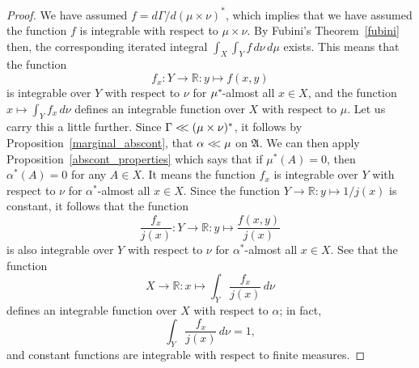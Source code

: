 \documentclass[
twoside=true,
paper=letter,
fontsize=9pt,
pagesize=auto,
leqno,
openany,
headsepline,
overfullrule,
]{scrbook}
\theoremstyle{plain}
\theoremstyle{plain}
\theoremstyle{definition}
\theoremstyle{bfnoteitalic}
\theoremstyle{bfnoteroman}
\newcommand{\sigalg}[1]{\mathfrak{#1}}
\newcommand{\R}{\mathbb{R}}
\newcommand{\sigmaalgebra}{\sigalg{A}}
\newcommand{\kernast}{\ast\kern-1pt}
\newcommand{\funcf}{f}
\newcommand{\funcj}{j}
\newcommand{\function}{f}
\newcommand{\measurespace}{X}
\newcommand{\measurespaceii}{Y}
\newcommand{\mspaceelt}{x}
\newcommand{\mspaceeltii}{y}
\newcommand{\abscont}{\mathrel{< \kern-3.5pt <}}
\newcommand{\measure}{\mu}
\newcommand{\measureii}{\nu}
\newcommand{\seti}{A}
\newcommand{\measonprod}{\Gamma}%
\newcommand{\marginalone}{\alpha}%
\begin{document}
\begin{proof}
We have assumed
$\function = d\measonprod / d(\measure\times\measureii)^*$,
which implies that we have assumed the function $\function$ is integrable with respect to 
$\measure\times\measureii$.
By Fubini's Theorem~\ref{fubini} then, the corresponding iterated integral
$\int_\measurespace\int_\measurespaceii \funcf \,d\measureii\,d\measure$
exists.
This means that the function
\[
\function_\mspaceelt:\measurespaceii\to\R :
\mspaceeltii\mapsto\function(\mspaceelt,\mspaceeltii)
\]
is integrable over $\measurespaceii$ with respect to $\measureii$ for 
$\measure^\kernast$-almost all 
$\mspaceelt\in\measurespace$,
and the function 
$\mspaceelt\mapsto 
\int_\measurespaceii \function_\mspaceelt \, d\measureii$ 
defines an integrable function over $\measurespace$ with respect to $\measure$.
Let us carry this
a little further.  
Since $\measonprod \abscont (\measure\times\measureii)^*$, it follows by Proposition~\ref{marginal_abscont}, that 
$\marginalone\abscont\measure$ on $\sigmaalgebra$.
We can then apply Proposition~\ref{abscont_properties} which says that if
$\measure^*(\seti)=0$, then $\marginalone^*(\seti)=0$ for any $\seti\in\measurespace$.
It means the function 
$\function_\mspaceelt$ 
is integrable over $\measurespaceii$ with respect to $\measureii$ for 
$\marginalone^*$-almost all $\mspaceelt\in\measurespace$.
Since the function
$\measurespaceii\to\R:\mspaceeltii\mapsto 1/ \funcj(\mspaceelt)$ 
is  constant, it follows that the function
\[
\frac{\function_\mspaceelt}{\funcj(\mspaceelt)} :
\measurespaceii\to\R :
\mspaceeltii\mapsto
\frac{\function(\mspaceelt,\mspaceeltii)}{\funcj(\mspaceelt)}
\]
is also integrable over $\measurespaceii$ with respect to $\measureii$ for 
$\marginalone^*$-almost all $\mspaceelt\in\measurespace$.
See that the function
\[
\measurespace\to\R :
\mspaceelt \mapsto 
\int_\measurespaceii 
\frac{\function_\mspaceelt}{\funcj(\mspaceelt)} 
\, d\measureii
\]
defines an integrable function over $\measurespace$ with respect to 
$\marginalone$; in fact,
\[
\int_\measurespaceii 
\frac{\function_\mspaceelt}{\funcj(\mspaceelt)} 
\, d\measureii
= 1,
\]
and constant functions are integrable with respect to finite measures.


\end{proof}
\end{document}
